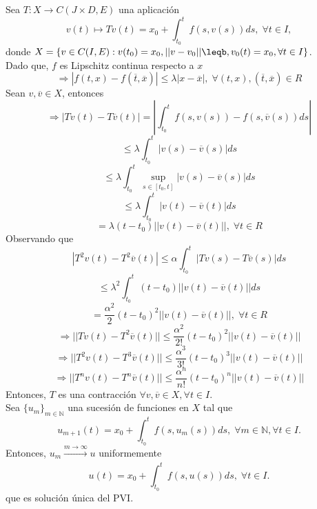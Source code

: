 \begin{dem}
  Sea $T: X \to C(J \times D, E)$ una aplicación
  \[
    v(t) \mapsto T v(t) = x_{0} + \int_{t_{0}}^{t} f(s, v(s)) ds, \; \forall t \in I,
  \]
  donde $X = \{ v \in C(I, E) : v(t_{0}) = x_{0}, ||v -v_{0}||\leqb, v_{0}(t) = x_{0}, \forall t \in I \}$. \\

  Dado que, $f$ es Lipschitz continua respecto a $x$
  \[ 
    \Rightarrow | f(t,x) - f(\overline{t},\overline{x}) | \leq \lambda | x - \overline{x} |, \; \forall (t,x), (\overline{t}, \overline{x}) \in R
  \] 
  Sean $v, \overline{v} \in X$, entonces
  \[ 
    \Rightarrow | Tv(t) - T\overline{v}(t) | = | \int_{t_{0}}^{t} f(s, v(s)) - f(s, \overline{v}(s)) ds |
  \] 
  \[ 
    \leq \lambda \int_{t_{0}}^{t} | v(s) - \overline{v}(s) | ds
  \] 
  \[ 
    \leq \lambda \int_{t_{0}}^{t} \sup_{s \in [t_{0}, t]}| v(s) - \overline{v}(s) | ds
  \] 
  \[ 
    \leq \lambda \int_{t_{0}}^{t} | v(t) - \overline{v}(t) | ds
  \] 
  \[ 
    = \lambda (t - t_{0}) || v(t) - \overline{v}(t) ||, \; \forall t \in R
  \] 
  Observando que
  \[ 
    | T^2 v(t) - T^2 \overline{v}(t) | \leq \alpha \int_{t_{0}}^{t} | Tv(s) - T \overline{v}(s) | ds
  \] 
  \[ 
    \leq \lambda^2 \int_{t_{0}}^{t} (t - t_{0})||v(t) - \overline{v}(t)|| ds 
  \] 
  \[ 
    = \frac{\alpha^2}{2}(t - t_{0})^2 ||v(t) - \overline{v}(t)||, \; \forall t \in R
  \] 
  \[
    \Rightarrow || Tv(t) - T^2 \overline{v} (t) || \leq \frac{\alpha^2}{2!}(t - t_{0})^2 ||v(t) - \overline{v}(t)||
  \]
  \[
    \Rightarrow || T^2v(t) - T^3 \overline{v} (t) || \leq \frac{\alpha^3}{3!}(t - t_{0})^3 ||v(t) - \overline{v}(t)||
  \]
  \[
    \Rightarrow || T^{n}v(t) - T^{n} \overline{v}(t) || \leq \frac{\alpha^n}{n!}(t - t_{0})^n ||v(t) - \overline{v}(t)||
  \]
  Entonces, $T$ es una contracción $\forall v, \overline{v} \in X, \forall t \in I$. \\

  Sea $\{ u_{m} \}_{ m \in \mathbb{N}}$ una sucesión de funciones en $X$ tal que
  \[
    u_{m+1}(t) = x_{0} + \int_{t_{0}}^{t} f(s, u_{m}(s)) ds, \; \forall m \in \mathbb{N}, \forall t \in I.
  \] 
  Entonces, $u_{m} \xrightarrow[]{ m \rightarrow \infty } u$ uniformemente 
  \[ 
    u(t) = x_{0} + \int_{t_{0}}^{t} f(s, u(s)) ds, \; \forall t \in I. 
  \] 
  que es solución única del PVI.
\end{dem}

